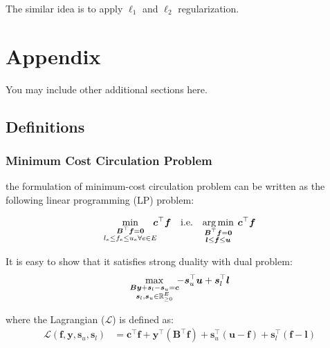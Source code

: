 \documentclass{article} %
\theoremstyle{bfnote}
\begin{document}
The similar idea is to apply $\ell_1$ and $\ell_2$ regularization.
\pagebreak






\pagebreak
\appendix
\section{Appendix}
You may include other additional sections here.

\subsection{Definitions}

\subsubsection{Minimum Cost Circulation Problem}
the formulation of minimum-cost circulation problem can be written as the following linear programming (LP) problem:

\begin{equation}
	\underset{\substack{\bm{B}^{\top} \bm{f}=\bm{0} \\ l_e \leq f_e \leq u_e \forall e \in E}}{\min } \hspace{-4pt} \bm{c}^{\top} \bm{f} \quad  \text{i.e.}	\quad 
	\underset{\substack{\bm{B}^{\top} \bm{f}=\bm{0} \\ \bm{l} \leq \bm{f} \leq \bm{u} }}{\arg \min } \hspace{4pt} \bm{c}^{\top} \bm{f}	
	\label{eq:5}
\end{equation}


It is easy to show that it satisfies strong duality with dual problem:
\begin{equation}
	\max _{\substack{\bm{B} \bm{y}+\bm{s}_{l}-\bm{s}_{u}=\bm{c}\\ \bm{s}_{l}, \bm{s}_{u} \in \mathbb{R}_{\geq 0}^E}} \hspace{-4pt} -\bm{s}_u^{\top} \bm{u}+\bm{s}_l^{\top} \bm{l}
	\label{eq:6}
\end{equation}

where the Lagrangian (\(\mathcal{L}\)) is defined as:
\[
\begin{aligned}
	\mathcal{L}(\bm{f}, \bm{y}, \bm{s}_{u}, \bm{s}_{l}) &= \bm{c}^{\top} \bm{f} + \bm{y}^{\top}(\bm{B}^{\top} \bm{f}) + \bm{s}_u^{\top}(\bm{u} - \bm{f}) + \bm{s}_l^{\top}(\bm{f} - \bm{l})
\end{aligned}
\]
\end{document}
